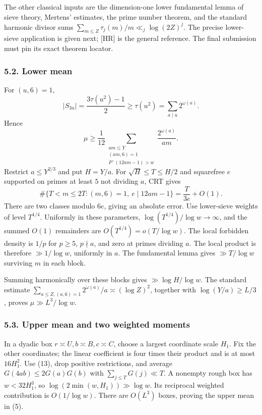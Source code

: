 \documentclass[
  english,
  11pt,
]{article}
\begin{document}
The other classical inputs are the dimension-one lower fundamental lemma
of sieve theory, Mertens' estimates, the prime number theorem, and the
standard harmonic divisor sums
\(\sum_{m\le Z}\tau_j(m)/m\ll_j\log(2Z)^j\). The precise lower-sieve
application is given next; {[}HR{]} is the general reference. The final
submission must pin its exact theorem locator.

\subsubsection{5.2. Lower mean}\label{lower-mean}

For \((u,6)=1\), \[
|S_{3u}|=\frac{3\tau(u^2)-1}{2}\ge\tau(u^2)
=\sum_{a\mid u}2^{\omega(a)}.
\] Hence \[
\mu\ge\frac1{12}
\sum_{\substack{am\le Y\\(am,6)=1\\P^-(12am-1)>w}}
\frac{2^{\omega(a)}}{am}. \tag{14}
\] Restrict \(a\le Y^{2/3}\) and put \(H=Y/a\). For
\(\sqrt H\le T\le H/2\) and squarefree \(e\) supported on primes at
least \(5\) not dividing \(a\), CRT gives \[
\#\{T<m\le2T:(m,6)=1,\ e\mid12am-1\}
=\frac{T}{3e}+O(1). \tag{15}
\] There are two classes modulo \(6e\), giving an absolute error. Use
lower-sieve weights of level \(T^{1/4}\). Uniformly in these parameters,
\(\log(T^{1/4})/\log w\to\infty\), and the summed \(O(1)\) remainders
are \(O(T^{1/4})=o(T/\log w)\). The local forbidden density is \(1/p\)
for \(p\ge5\), \(p\nmid a\), and zero at primes dividing \(a\). The
local product is therefore \(\gg1/\log w\), uniformly in \(a\). The
fundamental lemma gives \(\gg T/\log w\) surviving \(m\) in each block.

Summing harmonically over these blocks gives \(\gg\log H/\log w\). The
standard estimate
\(\sum_{a\le Z,(a,6)=1}2^{\omega(a)}/a\asymp(\log Z)^2\), together with
\(\log(Y/a)\ge L/3\), proves \(\mu\gg L^3/\log w\).

\subsubsection{5.3. Upper mean and two weighted
moments}\label{upper-mean-and-two-weighted-moments}

In a dyadic box \(r\asymp U,b\asymp B,c\asymp C\), choose a largest
coordinate scale \(H_1\). Fix the other coordinates; the linear
coefficient is four times their product and is at most \(16H_1^2\). Use
(13), drop positive restrictions, and average \(G(4ab)\le2G(a)G(b)\)
with \(\sum_{j\le T}G(j)\ll T\). A nonempty rough box has \(w<32H_1^3\),
so \(\log(2\min(w,H_1))\gg\log w\). Its reciprocal weighted contribution
is \(O(1/\log w)\). There are \(O(L^3)\) boxes, proving the upper mean
in (5).
\end{document}
